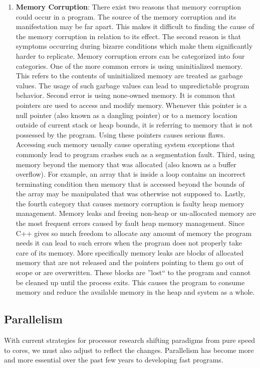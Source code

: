 \documentclass[letterpaper, 12pt]{article}
\begin{document}
\begin{enumerate}
  \item {\bfseries Memory Corruption}:
  There exist two reasons that memory corruption could occur in a program. The source of the 
  memory corruption and its manifestation may be far apart. This makes it difficult to finding 
  the cause of the memory corruption in relation to its effect. The second reason is that symptoms 
  occurring during bizarre conditions which make them significantly harder to replicate. Memory 
  corruption errors can be categorized into four categories. One of the more common errors is using 
  uninitialized memory. This refers to the contents of uninitialized memory are treated as garbage 
  values. The usage of such garbage values can lead to unpredictable program behavior. Second error 
  is using none-owned memory. It is common that pointers are used to access and modify memory. 
  Whenever this pointer is a null pointer (also known as a dangling pointer) or to a memory location 
  outside of current stack or heap bounds, it is referring to memory that is not possessed by the program. 
  Using these pointers causes serious flaws. Accessing such memory usually cause operating system exceptions that commonly 
  lead to program crashes such as a segmentation fault. Third, using memory beyond the memory that was 
  allocated (also known as a buffer overflow). For example, an array that is inside a loop contains an 
  incorrect terminating condition then memory that is accessed beyond the bounds of the array may be 
  manipulated that was otherwise not supposed to. Lastly, the fourth category that causes memory corruption 
  is faulty heap memory management. Memory leaks and freeing non-heap or un-allocated memory are the 
  most frequent errors caused by fault heap memory management. Since C++ gives so much freedom to 
  allocate any amount of memory the program needs it can lead to such errors when the program does 
  not properly take care of its memory. More specifically memory leaks are blocks of allocated memory 
  that are not released and the pointers pointing to them go out of scope or are overwritten. These blocks
  are ''lost`` to the program and cannot be cleaned up until the process exits. This causes the program to 
  consume memory and reduce the available memory in the heap and system as a whole.
\end{enumerate}

\subsection{Parallelism}
With current strategies for processor research shifting paradigms from pure speed to cores,
we must also adjust to reflect the changes. Parallelism has become more and more essential
over the past few years to developing fast programs.
\end{document}

